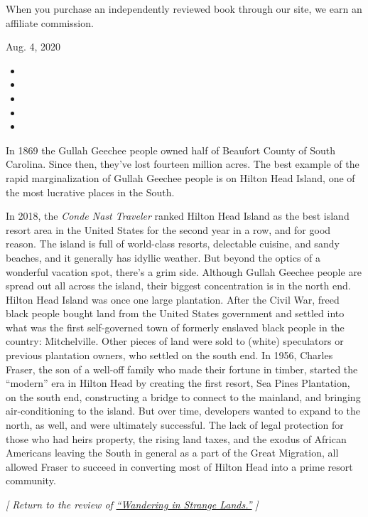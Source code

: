 When you purchase an independently reviewed book through our site, we
earn an affiliate commission.

Aug. 4, 2020

\begin{itemize}
\item
\item
\item
\item
\item
\end{itemize}

In 1869 the Gullah Geechee people owned half of Beaufort County of South
Carolina. Since then, they've lost fourteen million acres. The best
example of the rapid marginalization of Gullah Geechee people is on
Hilton Head Island, one of the most lucrative places in the South.

In 2018, the \emph{Conde Nast Traveler} ranked Hilton Head Island as the
best island resort area in the United States for the second year in a
row, and for good reason. The island is full of world-class resorts,
delectable cuisine, and sandy beaches, and it generally has idyllic
weather. But beyond the optics of a wonderful vacation spot, there's a
grim side. Although Gullah Geechee people are spread out all across the
island, their biggest concentration is in the north end. Hilton Head
Island was once one large plantation. After the Civil War, freed black
people bought land from the United States government and settled into
what was the first self-governed town of formerly enslaved black people
in the country: Mitchelville. Other pieces of land were sold to (white)
speculators or previous plantation owners, who settled on the south end.
In 1956, Charles Fraser, the son of a well-off family who made their
fortune in timber, started the ``modern'' era in Hilton Head by creating
the first resort, Sea Pines Plantation, on the south end, constructing a
bridge to connect to the mainland, and bringing air-conditioning to the
island. But over time, developers wanted to expand to the north, as
well, and were ultimately successful. The lack of legal protection for
those who had heirs property, the rising land taxes, and the exodus of
African Americans leaving the South in general as a part of the Great
Migration, all allowed Fraser to succeed in converting most of Hilton
Head into a prime resort community.

\emph{{[} Return to the review of}
\href{https://www.nytimes.com/2020/08/03/books/review/wandering-in-strange-lands-morgan-jerkins.html}{\emph{``Wandering
in Strange Lands.''}} \emph{{]}}

